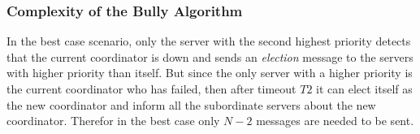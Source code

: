 \documentclass[dareport.tex]{subfiles}
\begin{document}
%		
%		
%		
%		
%		
%		

\subsubsection{Complexity of the Bully Algorithm}\label{sssec:ba-complexity}
In the best case scenario, only the server with the second highest priority detects that the current coordinator is down and sends an \emph{election} message to the servers with higher priority than itself. But since the only server with a higher priority is the current coordinator who has failed, then after timeout $ T2 $ it can elect itself as the new coordinator and inform all the subordinate servers about the new coordinator. Therefor in the best case only $ N-2 $ messages are needed to be sent.
\end{document}
